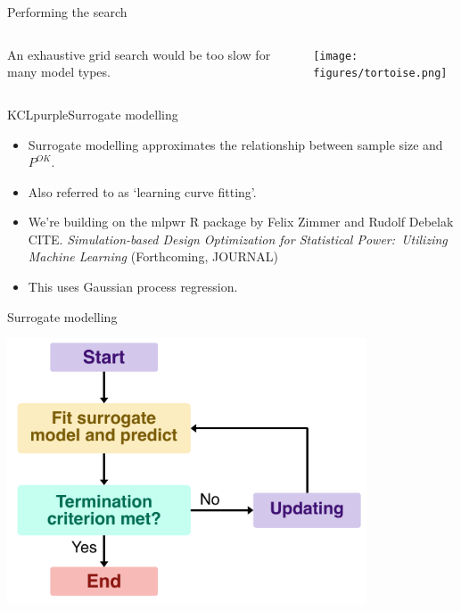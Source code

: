 \documentclass[11pt]{beamer}
\begin{document}
\begin{frame}[t]{Performing the search}

	\vspace{-1em}

	\begin{columns}
		\begin{column}[c]{0.55\textwidth}
			\centering
			An exhaustive grid search would be too slow for many model types.
		\end{column}
		\begin{column}[c]{0.30\textwidth}
			\texttt{[image: figures/tortoise.png]}
		\end{column}
	\end{columns}

	\vspace{-1.5em}

	\begin{cbox}{KCLpurple}{Surrogate modelling}


		\begin{itemize}
			\item Surrogate modelling approximates the relationship between
			      sample size and $P^{OK}$.
			\item Also referred to as `learning curve
			      fitting'\autocite{figueroa2012, dayimu2023}.
			\item We're building on the mlpwr R package by Felix Zimmer and
			      Rudolf Debelak CITE. \emph{Simulation-based Design
			      Optimization for Statistical Power:\ Utilizing Machine
			      Learning} (Forthcoming, JOURNAL)
			\item This uses Gaussian process regression.
		\end{itemize}
	\end{cbox}
\end{frame}

\begin{frame}[c]{Surrogate modelling}

	\centering
	\includegraphics[width=0.8\textwidth]{figures/surrogate_algorithm.pdf}

\end{frame}
\end{document}
